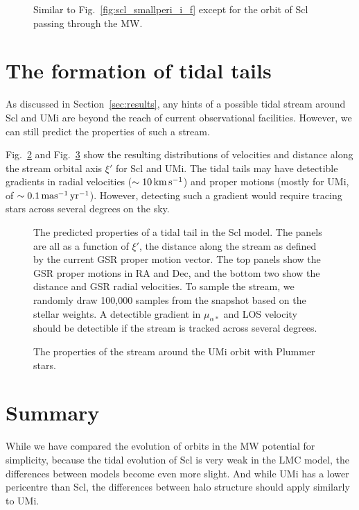 \begin{figure}
\centering
{}
\caption[Sculptor MW-impact density profiles]{Similar to
Fig.~\ref{fig:scl_smallperi_i_f} except for the orbit of Scl passing
through the MW.}\label{fig:scl_mw_impact_i_f}
\end{figure}

\section{The formation of tidal
tails}\label{the-formation-of-tidal-tails}

As discussed in Section~\ref{sec:results}, any hints of a possible tidal
stream around Scl and UMi are beyond the reach of current observational
facilities. However, we can still predict the properties of such a
stream.

Fig.~\ref{fig:scl_tidal_stream} and Fig.~\ref{fig:umi_tidal_stream} show
the resulting distributions of velocities and distance along the stream
orbital axis \(\xi'\) for Scl and UMi. The tidal tails may have
detectible gradients in radial velocities (\(\sim 10\,{\rm km\,s^{-1}}\)) and proper
motions (mostly for UMi, of \(\sim 0.1\,{\rm mas^{-1}\,yr^{-1}}\)). However, detecting
such a gradient would require tracing stars across several degrees on
the sky.

\begin{figure}
\centering
{}
\caption[Sculptor predicted stream]{The predicted properties of a tidal
tail in the Scl model. The panels are all as a function of \(\xi'\), the
distance along the stream as defined by the current GSR proper motion
vector. The top panels show the GSR proper motions in RA and Dec, and
the bottom two show the distance and GSR radial velocities. To sample
the stream, we randomly draw 100,000 samples from the snapshot based on
the stellar weights. A detectible gradient in \(\mu_{\alpha*}\) and LOS
velocity should be detectible if the stream is tracked across several
degrees.}\label{fig:scl_tidal_stream}
\end{figure}

\begin{figure}
\centering
{}
\caption[Ursa Minor predicted stream]{The properties of the stream
around the UMi \smallperi{} orbit with Plummer
stars.}\label{fig:umi_tidal_stream}
\end{figure}

\section{Summary}\label{summary}

While we have compared the evolution of orbits in the MW potential for
simplicity, because the tidal evolution of Scl is very weak in the LMC
model, the differences between models become even more slight. And while
UMi has a lower pericentre than Scl, the differences between halo
structure should apply similarly to UMi.
